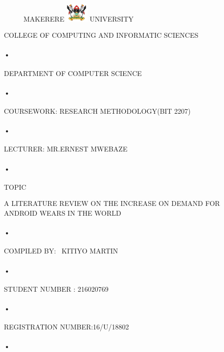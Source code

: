 \documentclass[9pt,a4paper]{article}
\begin{document}
\begin{titlepage}
  \begin{figure}[h]
  \centerline{\small MAKERERE 
  \includegraphics[width=0.1\textwidth]{muk_log} UNIVERSITY}
\end{figure}
\centerline{COLLEGE OF COMPUTING AND INFORMATIC SCIENCES}
\paragraph{•}
\centerline{DEPARTMENT OF COMPUTER SCIENCE\\}
\paragraph{•}

\centerline{COURSEWORK: RESEARCH METHODOLOGY(BIT 2207)\\}
\paragraph{•}

\centerline{LECTURER: MR.ERNEST MWEBAZE}
\paragraph{•}

\centerline{TOPIC\\}A LITERATURE REVIEW ON THE INCREASE ON DEMAND FOR ANDROID WEARS IN THE WORLD \\
\paragraph{•}
\centerline{COMPILED BY: \
 KITIYO MARTIN}
 \paragraph{•}
\centerline{STUDENT NUMBER :  216020769}
\paragraph{•}
\centerline{REGISTRATION NUMBER:16/U/18802}
\paragraph{•}
\end{titlepage}
\tableofcontents
\newpage
{}
\end{document}

